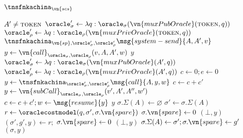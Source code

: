 \begin{transitionfn}{$\tnsfnkachina_{\vn{scs}}$}
  \begin{helpers}
      \State \Assert $A' \neq \textsc{token}$
      \State \Let $\oracle_\sigma' \gets \lambda q :
        \oracle_\sigma(\vn{muxPubOracle}(\textsc{token}, q))$
      \State \Let $\oracle_\rho' \gets \lambda q :
        \oracle_\rho(\vn{muxPrivOracle}(\textsc{token}, q))$
      \State \Run $\tnsfnkachina_{\vn{sp},\oracle_\sigma',
        \oracle_\rho'}\msg{system-send}{A, A', v}$
      \State \Let $y \gets \vn{call}_{\oracle_\sigma,\oracle_\rho}(v, A, A', w)$
      \State \Return $y$
    \EndFunction
      \State \Let $\oracle_\sigma' \gets \lambda q :
        \oracle_\sigma(\vn{muxPubOracle}(A', q))$
      \State \Let $\oracle_\rho' \gets \lambda q :
        \oracle_\rho(\vn{muxPrivOracle}(A', q))$
      \State \Let $c \gets 0; e \gets 0$
      \Repeat
        \State \Let $y \gets \tnsfnkachina_{\oracle_\sigma',
            \oracle_\rho'}\msg{call}{A, y, w}$
        \State \Let $c \gets c + c'$
          \State \Let $y \gets \vn{subCall}_{\oracle_\sigma,\oracle_\rho}(v', A', A'', w')$
          \State \Let $c \gets c + c';w \gets \msg{resume}{y}$
        \EndIf
      \State \Return $y$
    \EndFunction
        \Let $\sigma.\Sigma(A) \gets \varnothing$
      \EndIf
      \State \Let $\sigma' \gets \sigma.\Sigma(A)$
      \State \Let $r \gets \oraclecostmodel(q, \sigma', \sigma.\vn{spare})$
        \State $\sigma.\vn{spare} \gets 0$
        \State \Return $(\bot, y)$
      \EndIf
      \State \Let $(\sigma', g', y) \gets r;$
        \State $\sigma.\vn{spare} \gets 0$
        \State \Return $(\bot, y)$
      \Else
        \State $\sigma.\Sigma(A) \gets \sigma'; \sigma.\vn{spare} \gets g'$
        \State \Return $(\sigma, y)$
      \EndIf
    \EndFunction

\end{helpers}
\end{transitionfn}
